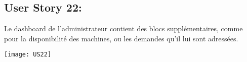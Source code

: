 \newpage{}
\subsection{User Story 22:}
Le dashboard de l'administrateur contient des blocs supplémentaires, comme pour la disponibilité des machines,
ou les demandes qu'il lui sont adressées.


  \begin{center}
        \texttt{[image: US22]}
  \end{center}